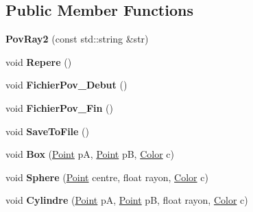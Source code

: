 \subsection*{Public Member Functions}
\begin{DoxyCompactItemize}
\item 
\mbox{\label{class_pov_ray_1_1_pov_ray2_a406830b8660f8b663638e088df68f667}} 
{\bfseries Pov\+Ray2} (const std\+::string \&str)
\item 
\mbox{\label{class_pov_ray_1_1_pov_ray2_a6252e0fcb0284511239b958d6055b753}} 
void {\bfseries Repere} ()
\item 
\mbox{\label{class_pov_ray_1_1_pov_ray2_a3aca29106ba7b7ea8e10319dc1daff12}} 
void {\bfseries Fichier\+Pov\+\_\+\+Debut} ()
\item 
\mbox{\label{class_pov_ray_1_1_pov_ray2_a86dd8fc3a11b14636660e0e79285bf68}} 
void {\bfseries Fichier\+Pov\+\_\+\+Fin} ()
\item 
\mbox{\label{class_pov_ray_1_1_pov_ray2_ae4d0d4637b7c82467f83106251dc5590}} 
void {\bfseries Save\+To\+File} ()
\item 
\mbox{\label{class_pov_ray_1_1_pov_ray2_a37d75622523e020b273c38a4cfebf0cd}} 
void {\bfseries Box} (\mbox{\hyperlink{class_pov_ray_1_1_pov_ray2_1_1_point}{Point}} pA, \mbox{\hyperlink{class_pov_ray_1_1_pov_ray2_1_1_point}{Point}} pB, \mbox{\hyperlink{class_pov_ray_1_1_pov_ray2_1_1_color}{Color}} c)
\item 
\mbox{\label{class_pov_ray_1_1_pov_ray2_a953d98ac33a6451d6cf8162d9c107088}} 
void {\bfseries Sphere} (\mbox{\hyperlink{class_pov_ray_1_1_pov_ray2_1_1_point}{Point}} centre, float rayon, \mbox{\hyperlink{class_pov_ray_1_1_pov_ray2_1_1_color}{Color}} c)
\item 
\mbox{\label{class_pov_ray_1_1_pov_ray2_ac9831468bc6d2d197682845c7ee6c7f7}} 
void {\bfseries Cylindre} (\mbox{\hyperlink{class_pov_ray_1_1_pov_ray2_1_1_point}{Point}} pA, \mbox{\hyperlink{class_pov_ray_1_1_pov_ray2_1_1_point}{Point}} pB, float rayon, \mbox{\hyperlink{class_pov_ray_1_1_pov_ray2_1_1_color}{Color}} c)

\end{DoxyCompactItemize}
